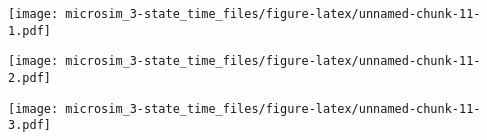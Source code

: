 \documentclass[
]{article}
\newenvironment{Shaded}{\begin{snugshade}}{\end{snugshade}}
\newcommand{\CommentTok}[1]{\textcolor[rgb]{0.56,0.35,0.01}{\textit{#1}}}
\newcommand{\DataTypeTok}[1]{\textcolor[rgb]{0.13,0.29,0.53}{#1}}
\newcommand{\KeywordTok}[1]{\textcolor[rgb]{0.13,0.29,0.53}{\textbf{#1}}}
\newcommand{\NormalTok}[1]{#1}
\newcommand{\OperatorTok}[1]{\textcolor[rgb]{0.81,0.36,0.00}{\textbf{#1}}}
\newcommand{\StringTok}[1]{\textcolor[rgb]{0.31,0.60,0.02}{#1}}
\begin{document}
\texttt{[image: microsim\_3-state\_time\_files/figure-latex/unnamed-chunk-11-1.pdf]}

\begin{Shaded}
\end{Shaded}

\texttt{[image: microsim\_3-state\_time\_files/figure-latex/unnamed-chunk-11-2.pdf]}

\begin{Shaded}
\end{Shaded}

\texttt{[image: microsim\_3-state\_time\_files/figure-latex/unnamed-chunk-11-3.pdf]}
\end{document}
